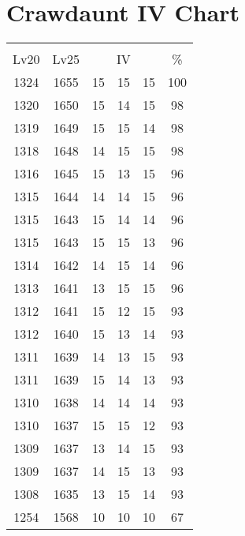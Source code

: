 \documentclass{article}%
\begin{document}
%
\normalsize%
\section{Crawdaunt IV Chart}%
\label{sec:Crawdaunt IV Chart}%
\renewcommand{\arraystretch}{1.5}%
\begin{tabular}{|c|c|c|c|c|c|}%
\hline%
\multicolumn{6}{|c|}{\textcolor{white}{ 
\linebreak{Crawdaunt}
}%
\cellcolor{black}}\\%
\multicolumn{1}{|c}{Lv20}&\multicolumn{1}{c|}{Lv25}&\multicolumn{3}{c|}{IV}&\multicolumn{1}{|c|}{\%}\\%
\hline%
\rowcolor{color100}%
1324&1655&15&15&15&100\\%
\hline%
\rowcolor{color98}%
1320&1650&15&14&15&98\\%
\hline%
\rowcolor{color98}%
1319&1649&15&15&14&98\\%
\hline%
\rowcolor{color98}%
1318&1648&14&15&15&98\\%
\hline%
\rowcolor{color96}%
1316&1645&15&13&15&96\\%
\hline%
\rowcolor{color96}%
1315&1644&14&14&15&96\\%
\hline%
\rowcolor{color96}%
1315&1643&15&14&14&96\\%
\hline%
\rowcolor{color96}%
1315&1643&15&15&13&96\\%
\hline%
\rowcolor{color96}%
1314&1642&14&15&14&96\\%
\hline%
\rowcolor{color96}%
1313&1641&13&15&15&96\\%
\hline%
\rowcolor{color93}%
1312&1641&15&12&15&93\\%
\hline%
\rowcolor{color93}%
1312&1640&15&13&14&93\\%
\hline%
\rowcolor{color93}%
1311&1639&14&13&15&93\\%
\hline%
\rowcolor{color93}%
1311&1639&15&14&13&93\\%
\hline%
\rowcolor{color93}%
1310&1638&14&14&14&93\\%
\hline%
\rowcolor{color93}%
1310&1637&15&15&12&93\\%
\hline%
\rowcolor{color93}%
1309&1637&13&14&15&93\\%
\hline%
\rowcolor{color93}%
1309&1637&14&15&13&93\\%
\hline%
\rowcolor{color93}%
1308&1635&13&15&14&93\\%
\hline%
\rowcolor{color91}%
1254&1568&10&10&10&67\\%
\end{tabular}

%
\end{document}
